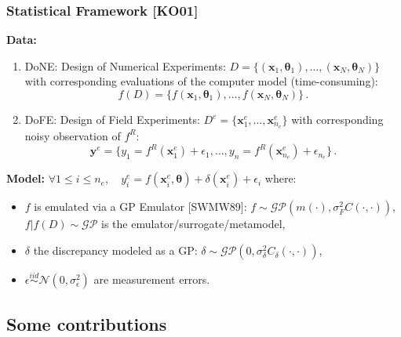 \documentclass[nopagenumber,9pt]{beamer}
\newcommand{\btheta}{\boldsymbol{\theta}}
\newcommand{\by}{\mathbf{y}}
\newcommand{\bx}{\mathbf{x}}
\newcommand{\bxf}{\bx^e}
\newcommand{\nf}{n_e}
\newcommand{\Df}{D^e}
\newcommand{\yf}{y^e}
\newcommand{\byf}{\by^e}
\newcommand{\citemano}[1]{\textcolor{dgreen}{#1}}
\begin{document}
\begin{frame}
 \frametitle{Statistical Framework \citemano{[KO01]}}

\textbf{Data:}

\begin{enumerate}
 \item DoNE: Design of Numerical Experiments: $D=\{(\bx_1,\btheta_1),\ldots,(\bx_N,\btheta_N)\}$  %
with corresponding evaluations of the computer model (time-consuming):
$$f(D)=\{f(\bx_1,\btheta_1),\ldots,f(\bx_N,\btheta_N)\}\,.$$ 
 
 
 \item DoFE: Design of Field Experiments: $\Df=\{\bxf_1,\ldots,\bxf_{\nf}\}$ with corresponding noisy observation of $f^R$:$$\byf=\{y_1=f^R(\bxf_1)+\epsilon_1,\ldots,y_n=f^R(\bxf_{\nf})+\epsilon_{\nf}\}\,.$$ 
\end{enumerate}



 
 
 
\smallskip

\textbf{Model:}\quad
$\forall 1\le i \le \nf,\quad \yf_i = f(\bxf_i,\btheta) + \delta(\bxf_i) +\epsilon_i$
where:

\smallskip
\begin{itemize}
 \item $f$ is emulated via a GP Emulator \citemano{[SWMW89]}: $f\sim \mathcal{GP}(m(\cdot),\sigma_F^2C(\cdot,\cdot))$,\\ $f|f(D)\sim \mathcal{GP}$ is the emulator/surrogate/metamodel,
 \item $\delta$ the discrepancy modeled as a GP: $\delta\sim \mathcal{GP}(0,\sigma_\delta^2C_\delta(\cdot,\cdot))$,
 \item $\epsilon\overset{iid}{\sim}\mathcal{N}(0,\sigma_{\epsilon}^2)$ are measurement errors.
\end{itemize}






\end{frame}


\subsection{Some contributions}
\end{document}
